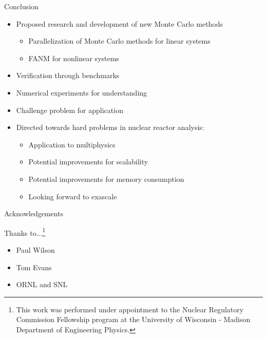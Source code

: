 \documentclass{beamer}
\begin{document}
\begin{frame}{Conclusion}

  \begin{itemize}
  \item Proposed research and development of new Monte Carlo methods
    \begin{itemize}
    \item Parallelization of Monte Carlo methods for linear systems
    \item FANM for nonlinear systems
    \end{itemize}
  \item Verification through benchmarks
  \item Numerical experiments for understanding
  \item Challenge problem for application
  \item Directed towards hard problems in nuclear reactor analysis:
    \begin{itemize}
    \item Application to multiphysics
    \item Potential improvements for scalability
    \item Potential improvements for memory consumption
    \item Looking forward to exascale
    \end{itemize}
  \end{itemize}

\end{frame}

\begin{frame}{Acknowledgements}

  Thanks to...\footnote{This work was performed under
        appointment to the Nuclear Regulatory Commission Fellowship
        program at the University of Wisconsin - Madison Department of
        Engineering Physics.}

  \begin{itemize}
  \item Paul Wilson
  \item Tom Evans
  \item ORNL and SNL
  \end{itemize}

\end{frame}

\end{document}
